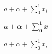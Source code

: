 \documentclass{article}
\begin{document}
$a+\alpha + \sum_0^1 x_i$

$𝒂+𝜶 + \sum_𝟎^𝟏 𝒙$

\boldmath

$a+\alpha + \sum_0^1 x_i$
\end{document}
